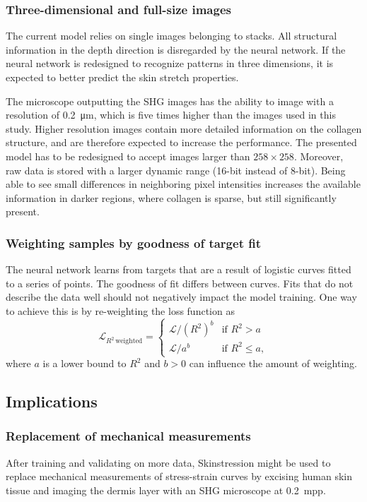 \subsubsection{Three-dimensional and full-size images}
The current model relies on single images belonging to stacks.
All structural information in the depth direction is disregarded by the neural network.
If the neural network is redesigned to recognize patterns in three dimensions, it is expected to better predict the skin stretch properties.

The microscope outputting the SHG images has the ability to image with a resolution of \qty{0.2}{\micro\meter}, which is five times higher than the images used in this study.
Higher resolution images contain more detailed information on the collagen structure, and are therefore expected to increase the performance.
The presented model has to be redesigned to accept images larger than $258\times258$.
Moreover, raw data is stored with a larger dynamic range (16-bit instead of 8-bit).
Being able to see small differences in neighboring pixel intensities increases the available information \eg in darker regions, where collagen is sparse, but still significantly present.

\subsubsection{Weighting samples by goodness of target fit}
The neural network learns from targets that are a result of logistic curves fitted to a series of points.
The goodness of fit differs between curves.
Fits that do not describe the data well should not negatively impact the model training.
One way to achieve this is by re-weighting the loss function as
\begin{equation}
    \mathcal{L}_{R^2\,\mathrm{weighted}} =
    \begin{cases}
        \mathcal{L} / \left(R^2\right)^b & \text{if } R^2 > a     \\
        \mathcal{L} / a^b                & \text{if } R^2 \leq a,
    \end{cases}
\end{equation}
where $a$ is a lower bound to $R^2$ and $b > 0$ can influence the amount of weighting.

\subsection{Implications}
\subsubsection{Replacement of mechanical measurements}
After training and validating on more data, Skinstression might be used to replace mechanical measurements of stress-strain curves by excising human skin tissue and imaging the dermis layer with an SHG microscope at \qty{0.2}{mpp}.

